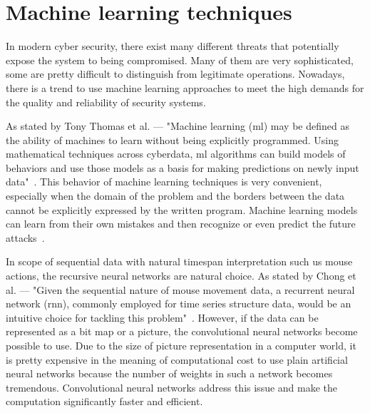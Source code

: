 \section{Machine learning techniques}\label{sec:machine-learning-techniques}
In modern cyber security, there exist many different threats that potentially expose the system to being compromised.
Many of them are very sophisticated, some are pretty difficult to distinguish from legitimate operations.
Nowadays, there is a trend to use machine learning approaches to meet the high demands for the quality and reliability of security systems.

As stated by Tony Thomas et al. --- "Machine learning (\gls{ml}) may be defined as the ability of machines to learn without being explicitly programmed.
Using mathematical techniques across cyberdata, \gls{ml} algorithms can build models of behaviors and use those models as a basis for making predictions on newly input data"~\cite{thomas2020machine}.
This behavior of machine learning techniques is very convenient, especially when the domain of the problem and the borders between the data cannot be explicitly expressed by the written program.
Machine learning models can learn from their own mistakes and then recognize or even predict the future attacks~\cite{thomas2020machine}.

In scope of sequential data with natural timespan interpretation such us mouse actions, the recursive neural networks are natural choice.
As stated by Chong et al. --- "Given the sequential nature of mouse movement data, a recurrent neural network (\gls{rnn}), commonly employed for time series structure data, would be an intuitive choice for tackling this problem"~\cite{Main}.
However, if the data can be represented as a bit map or a picture, the convolutional neural networks become possible to use.
Due to the size of picture representation in a computer world, it is pretty expensive in the meaning of computational cost to use plain artificial neural networks because the number of weights in such a network becomes tremendous.
Convolutional neural networks address this issue and make the computation significantly faster and efficient.

